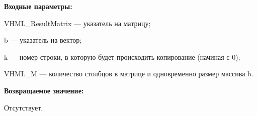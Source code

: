 \textbf{Входные параметры:}  
 
VHML\_ResultMatrix --- указатель на матрицу;
 
b --- указатель на вектор;
 
k --- номер строки, в которую будет происходить копирование (начиная с 0);
 
VHML\_M --- количество столбцов в матрице и одновременно размер массива b.

\textbf{Возвращаемое значение:}

Отсутствует.